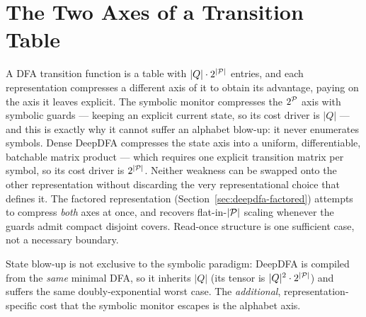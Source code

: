 
\section{The Two Axes of a Transition Table}
\label{sec:duality}

A DFA transition function is a table with $|Q| \cdot 2^{|{\mathcal{P}}|}$ entries, and each
representation compresses a different axis of it to obtain its advantage, paying on the
axis it leaves explicit. The symbolic monitor compresses the $2^{\mathcal{P}}$ axis with symbolic
guards --- keeping an explicit current state, so its cost driver is $|Q|$ --- and this is
exactly why it cannot suffer an alphabet blow-up: it never enumerates symbols. Dense
DeepDFA compresses the state axis into a uniform, differentiable, batchable matrix
product --- which requires one explicit transition matrix per symbol, so its cost driver
is $2^{|{\mathcal{P}}|}$. Neither weakness can be swapped onto the other representation without
discarding the very representational choice that defines it. The factored representation
(Section~\ref{sec:deepdfa-factored}) attempts to compress \emph{both} axes at once, and
recovers flat-in-$|{\mathcal{P}}|$ scaling whenever the guards admit compact disjoint covers.
Read-once structure is one sufficient case, not a necessary boundary.

State blow-up is not exclusive to the symbolic paradigm: DeepDFA is compiled from the
\emph{same} minimal DFA, so it inherits $|Q|$ (its tensor is $|Q|^2 \cdot 2^{|{\mathcal{P}}|}$)
and suffers the same doubly-exponential worst case. The \emph{additional},
representation-specific cost that the symbolic monitor escapes is the alphabet axis.

